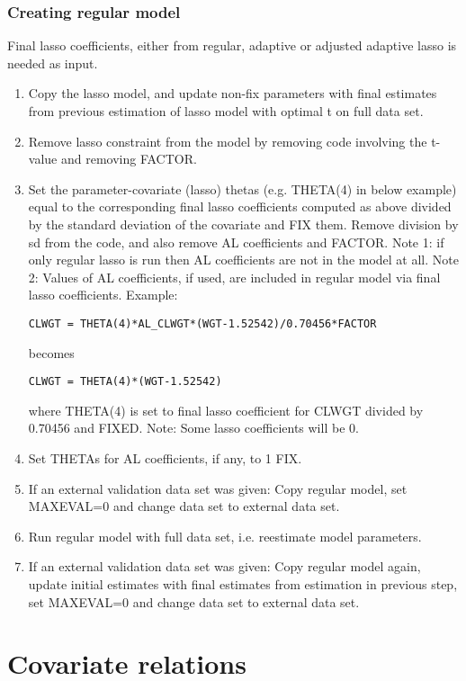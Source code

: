 \subsubsection*{Creating regular model}
Final lasso coefficients, either from regular, adaptive or adjusted adaptive lasso is needed as input. 
\begin{enumerate}
\item Copy the lasso model, and update non-fix parameters with final estimates from
previous estimation of lasso model with optimal t on full data set.
\item Remove lasso constraint from the model by removing code involving the t-value and removing FACTOR.
\item Set the parameter-covariate (lasso) thetas
(e.g. THETA(4) in below example) equal to the corresponding final lasso coefficients
computed as above divided by the standard deviation of the covariate
and FIX them. Remove division by sd from the code, and also remove AL coefficients and FACTOR.
Note 1: if only regular lasso is run then AL coefficients are not
in the model at all. Note 2: Values of AL coefficients, if used, are included in regular model via final lasso coefficients.
Example:
\begin{verbatim}
CLWGT = THETA(4)*AL_CLWGT*(WGT-1.52542)/0.70456*FACTOR
\end{verbatim}
becomes
\begin{verbatim}
CLWGT = THETA(4)*(WGT-1.52542)
\end{verbatim}
where THETA(4) is set to final lasso coefficient for CLWGT divided by 0.70456 and FIXED.
Note: Some lasso coefficients will be 0.
\item Set THETAs for AL coefficients, if any, to 1 FIX. 
\item If an external validation data set was given: Copy regular model, set MAXEVAL=0 and change data set to
external data set.
\item Run regular model with full data set, i.e. reestimate model parameters.
\item If an external validation data set was given: Copy regular model again, update initial estimates
with final estimates from estimation in previous step, set MAXEVAL=0 and change data set to
external data set.
\end{enumerate}

\section{Covariate relations}
